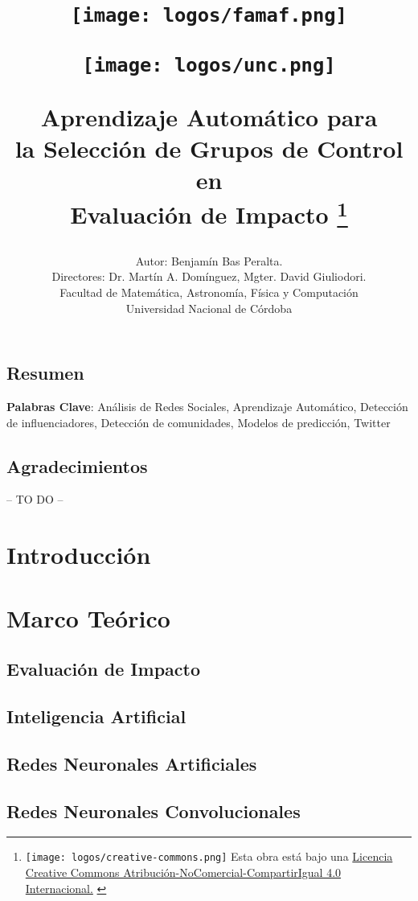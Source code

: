\documentclass[a4paper,12pt,spanish]{book}
\title{
    \begin{minipage}{0.4\textwidth}
        \centering
        \texttt{[image: logos/famaf.png]}
    \end{minipage}
    \hfill
    \begin{minipage}{0.4\textwidth}
        \centering
        \texttt{[image: logos/unc.png]}
    \end{minipage}
    
    \textbf{
        Aprendizaje Automático para \\
        la Selección de Grupos de Control en \\
        Evaluación de Impacto
    } 
    \thanks{
        {
        {\protect\texttt{[image: logos/creative-commons.png]}} \fontsize{10}{11}\selectfont  Esta obra está bajo una \href{https://creativecommons.org/licenses/by-nc-sa/4.0/}{Licencia Creative Commons Atribución-NoComercial-CompartirIgual 4.0 Internacional.}
        }
    }
}
\author{
    Autor: Benjam\'in Bas Peralta.\\
    Directores: Dr. Martín A. Domínguez, Mgter. David Giuliodori.\\ 
    Facultad de Matemática, Astronomía, Física y Computación\\
    Universidad Nacional de Córdoba
}
\begin{document}
\maketitle
\cleardoublepage

\section*{Resumen}

\bigskip
\textbf{Palabras Clave}: Análisis de Redes Sociales, Aprendizaje Automático, Detección de influenciadores, Detección de comunidades, Modelos de predicción, Twitter
\clearpage

\thispagestyle{empty}
\section*{Agradecimientos}
-- TO DO --
\clearpage

\tableofcontents
\clearpage

\chapter{Introducción}


\chapter{Marco Teórico}



\section{Evaluación de Impacto}


\section{Inteligencia Artificial}


\section{Redes Neuronales Artificiales}



\section{Redes Neuronales Convolucionales}

\end{document}

